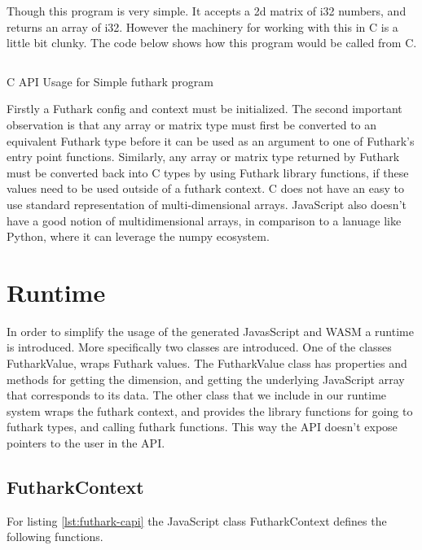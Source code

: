 \documentclass[11pt]{book}
\begin{document}
Though this program is very simple. It accepts a 2d matrix of i32 numbers, and returns an array of i32. However the machinery for working with this in C is a little bit clunky. The code below shows how this program would be called from C.

\begin{listing}[H] 
        \inputminted[fontsize=\small,baselinestretch=0.5,linenos]{C}{code/compiler/c-backend/example.c}
        \caption{C API Usage for Simple futhark program}

        \label{lst:capi}    
\end{listing} 

Firstly a Futhark config and context must be initialized. The second important observation is that any array or matrix type must first be converted to an equivalent Futhark type before it can be used as an argument to one of Futhark's entry point functions. Similarly, any array or matrix type returned by Futhark must be converted back into C types by using Futhark library functions, if these values need to be used outside of a futhark context. C does not have an easy to use standard representation of multi-dimensional arrays. JavaScript also doesn't have a good notion of multidimensional arrays, in comparison to a lanuage like Python, where it can leverage the numpy ecosystem. 

\section{Runtime}
In order to simplify the usage of the generated JavasScript and WASM a runtime is introduced. More specifically two classes are introduced. One of the classes FutharkValue, wraps Futhark values. The FutharkValue class has properties and methods for getting the dimension, and getting the underlying JavaScript array that corresponds to its data. The other class that we include in our runtime system wraps the futhark context, and provides the library functions for going to futhark types, and calling futhark functions. This way the API doesn't expose pointers to the user in the API. 


\subsection{FutharkContext}

For listing \ref{lst:futhark-capi} the JavaScript class FutharkContext defines the following functions.
\end{document}

